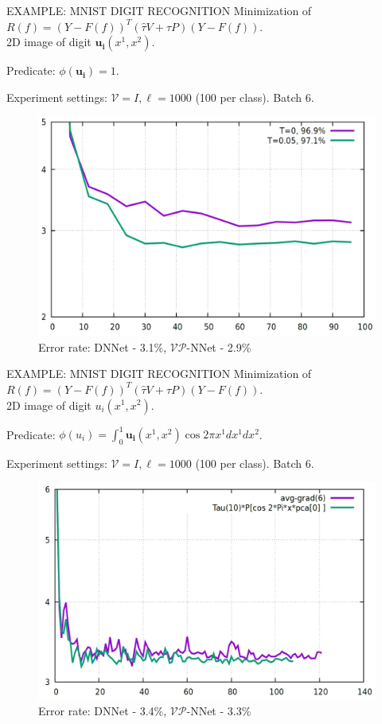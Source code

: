 \documentclass[11pt]{beamer}
\begin{document}
\begin{frame}{EXAMPLE: MNIST DIGIT RECOGNITION}
Minimization of $R(f) = (Y - F(f))^{T}(\hat{\tau}V + \tau P)(Y - F(f))$.\\
2D image of digit $\mathbf{u_{i}}(x^{1}, x^{2})$. 
\begin{center}
Predicate: $\phi(\mathbf{u_{i}}) = 1$.
\end{center}
Experiment settings: $\mathcal{V} = I, \ell = 1000$ (100 per class). Batch 6.
\begin{figure}
\centering
\includegraphics[width=.8\linewidth]{Imgs/mnist-.predicate-1png}\\
Error rate: DNNet - 3.1\%, \quad $\mathcal{VP}$-NNet - 2.9\%
\end{figure}
\end{frame}

\begin{frame}{EXAMPLE: MNIST DIGIT RECOGNITION}
Minimization of $R(f) = (Y - F(f))^{T}(\hat{\tau}V + \tau P)(Y - F(f))$.\\
2D image of digit $u_{i}(x^{1}, x^{2})$. 
\begin{center}
Predicate: $\phi(u_{i}) = \int_{0}^{1}\mathbf{u_{i}}(x^{1}, x^{2})\cos 2\pi x^{1}dx^{1}dx^{2}$.
\end{center}
Experiment settings: $\mathcal{V} = I, \ell = 1000$ (100 per class). Batch 6.
\begin{figure}
\centering
\includegraphics[width=.8\linewidth]{Imgs/mnist-.predicate-2png}\\
Error rate: DNNet - 3.4\%, \quad $\mathcal{VP}$-NNet - 3.3\%
\end{figure}
\end{frame}
\end{document}
